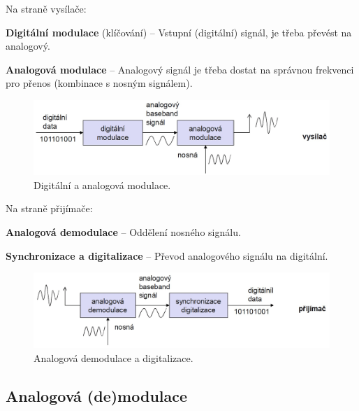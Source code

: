 \begin{compactitem}
    \item Na straně vysílače: \begin{compactitem}
        \item \textbf{Digitální modulace} (klíčování) -- Vstupní (digitální) signál, je třeba převést na analogový.

        \item \textbf{Analogová modulace} -- Analogový signál je třeba dostat na správnou frekvenci pro přenos (kombinace s nosným signálem).
    \end{compactitem}

    \begin{figure}[H]
        \centering
        \includegraphics[width=1\linewidth]{modulace.png}
        \caption{Digitální a analogová modulace.}
    \end{figure}

    \item Na straně přijímače: \begin{compactitem}
        \item \textbf{Analogová demodulace} -- Oddělení nosného signálu.

        \item \textbf{Synchronizace a digitalizace} -- Převod analogového signálu na digitální.
    \end{compactitem}

    \begin{figure}[H]
        \centering
        \includegraphics[width=1\linewidth]{demodulace.png}
        \caption{Analogová demodulace a digitalizace.}
    \end{figure}
\end{compactitem}

\subsection{Analogová (de)modulace}

